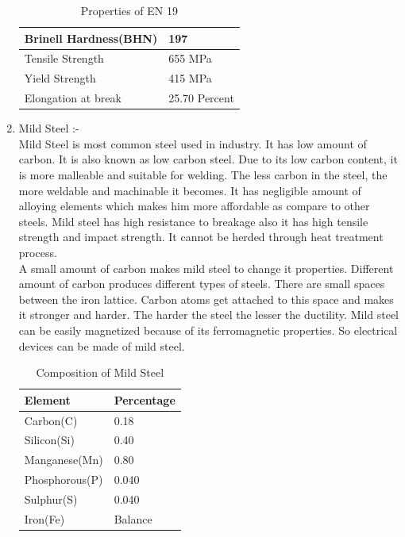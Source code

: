\documentclass[16pt,a4paper]{article}
\begin{document}
\begin{enumerate}
\begin{table}[H]
\end{table}

\begin{table}[H]

\centering
\caption{Properties of EN 19}
\begin{tabular}{| l | l |}
\hline
Brinell Hardness(BHN) & 197 \\
\hline
Tensile Strength & 655 MPa \\
\hline
Yield Strength & 415 MPa \\
\hline
Elongation at break & 25.70 Percent \\
\hline
\end{tabular}

\end{table}


\item Mild Steel :- 
\\Mild Steel is most common steel used in industry. It has low amount of carbon. It is also known as low carbon steel. Due to its low carbon content, it is more malleable and suitable for welding. The less carbon in the steel, the more weldable and machinable it becomes. It has negligible amount of alloying elements which makes him more affordable as compare to other steels. Mild steel has high resistance to breakage also it has high tensile strength and impact strength. It cannot be herded through heat treatment process.
\\A small amount of carbon makes mild steel to change it properties. Different amount of carbon produces different types of steels. There are small spaces between the iron lattice. Carbon atoms get attached to this space and makes it stronger and harder. The harder the steel the lesser the ductility. Mild steel can be easily magnetized because of its ferromagnetic properties. So electrical devices can be made of mild steel.


\begin{table}[H]

\centering
\caption{Composition of Mild Steel}
\begin{tabular}{| l | l |}
\hline
Element & Percentage \\
\hline
Carbon(C) & 0.18 \\
\hline
Silicon(Si) & 0.40 \\
\hline
Manganese(Mn) & 0.80 \\
\hline
Phosphorous(P) & 0.040 \\
\hline
Sulphur(S) & 0.040 \\
\hline
Iron(Fe) & Balance \\
\hline
\end{tabular}


\end{table}
\end{enumerate}
\end{document}
